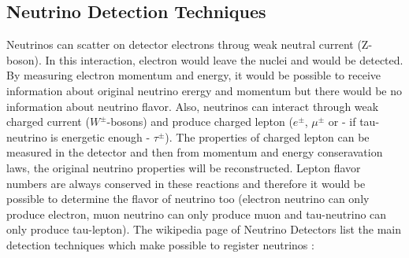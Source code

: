 \subsection{Neutrino Detection Techniques} 
Neutrinos can scatter on detector electrons throug weak neutral current (Z-boson). In this interaction, electron would leave the nuclei and would be detected. By measuring electron momentum and energy, it would be possible to receive information about original neutrino erergy and momentum but there would be no information about neutrino flavor. Also, neutrinos can interact through weak charged current ($W^\pm$-bosons) and produce charged lepton ($e^\pm$, $\mu^\pm$ or - if tau-neutrino is energetic enough - $\tau^\pm$). The properties of charged lepton can be measured in the detector and then from momentum and energy conseravation laws, the original neutrino properties will be reconstructed. Lepton flavor numbers are always conserved in these reactions and therefore it would be possible to determine the flavor of neutrino too (electron neutrino can only produce electron, muon neutrino can only produce muon and tau-neutrino can only produce tau-lepton).
The wikipedia page of Neutrino Detectors list the main detection techniques which make possible to register neutrinos \cite{ref_wiki_NeutrinoDetectors}:

